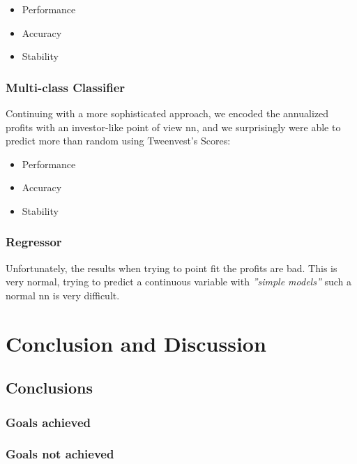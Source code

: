 \documentclass[11pt,english,a4paper,hidelinks]{book}
\begin{document}
\begin{itemize}
    \item Performance
    \item Accuracy
    \item Stability
\end{itemize}

\subsection{Multi-class Classifier}

Continuing with a more sophisticated approach, we encoded the annualized profits with an investor-like point of view \acrshort{nn}, and we surprisingly were able to predict more than random using Tweenvest's Scores:

\begin{itemize}
    \item Performance
    \item Accuracy
    \item Stability
\end{itemize}


\subsection{Regressor}

Unfortunately, the results when trying to point fit the profits are bad. This is very normal, trying to predict a continuous variable with \textit{''simple models''} such a normal \acrshort{nn} is very difficult. 






\chapter{Conclusion and Discussion}

\section{Conclusions}

\subsection{Goals achieved}

\subsection{Goals not achieved}
\end{document}
